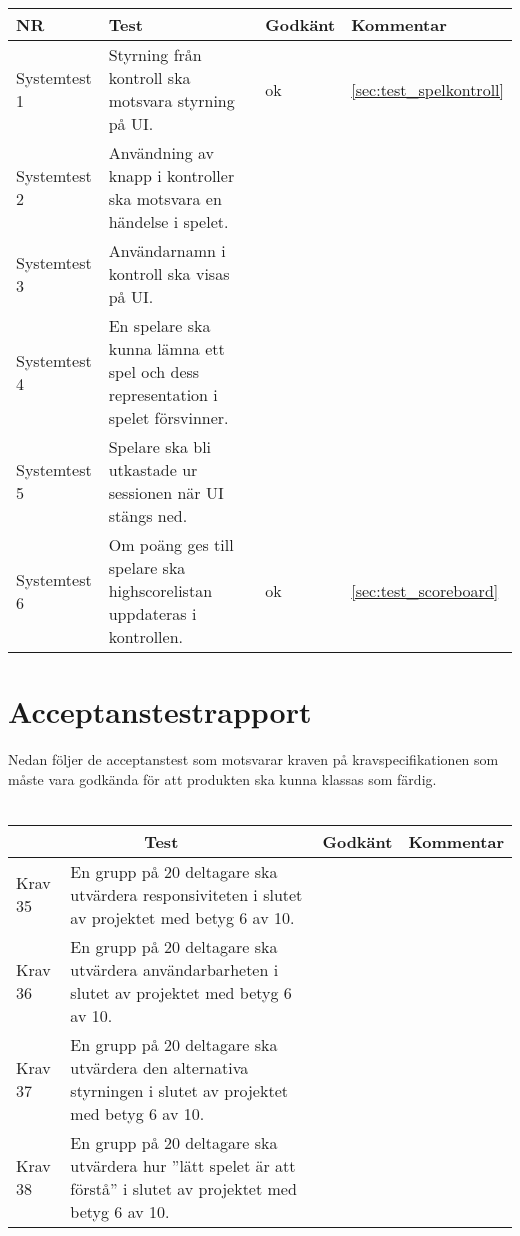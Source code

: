 \documentclass[10pt]{article}
\begin{document}
	\begin{tabular}{| p{2.1cm}| p{5cm}| p{1.2cm}| p{7cm}|}
      		\hline
      		NR&Test&Godkänt&Kommentar\\
      		\hline
    
		Systemtest 1&Styrning från kontroll ska motsvara styrning på UI.&ok&\ref{sec:test_spelkontroll}\\
		\hline
		Systemtest 2&Användning av knapp i kontroller ska motsvara en händelse i spelet.&&\\
		\hline
		Systemtest 3&Användarnamn i kontroll ska visas på UI.&&\\
		\hline
		Systemtest 4&En spelare ska kunna lämna ett spel och dess representation i spelet försvinner.&&\\
		\hline
		Systemtest 5&Spelare ska bli utkastade ur sessionen när UI stängs ned.&&\\
		\hline
		Systemtest 6&Om poäng ges till spelare ska highscorelistan uppdateras i kontrollen.&ok&\ref{sec:test_scoreboard}\\
		\hline



   
  \end{tabular}
  
\section{Acceptanstestrapport}
Nedan följer de acceptanstest som motsvarar kraven på kravspecifikationen \cite{bib-kravspec} som måste vara godkända för att produkten ska kunna klassas som färdig.
\\ \\
\noindent
	\begin{tabular}{| p{1.5cm} | p{5cm} | p{1.2cm}| p{7cm}|}
	
  \hline
    \multicolumn{2}{|c|}{Test}&{Godkänt}&{Kommentar}\\
    \hline


		Krav 35& En grupp på 20 deltagare ska utvärdera responsiviteten i slutet av projektet med betyg 6 av 10.&& \\
		\hline
		Krav 36& En grupp på 20 deltagare ska utvärdera användarbarheten i slutet av projektet med betyg 6 av 10.&& \\
		\hline
		Krav 37& En grupp på 20 deltagare ska utvärdera den alternativa styrningen i slutet av projektet med betyg 6 av 10.&& \\
		\hline
		Krav 38& En grupp på 20 deltagare ska utvärdera hur ''lätt spelet är att förstå'' i slutet av projektet med betyg 6 av 10.&& \\
		\hline

   
  \end{tabular}
  
\end{document}
